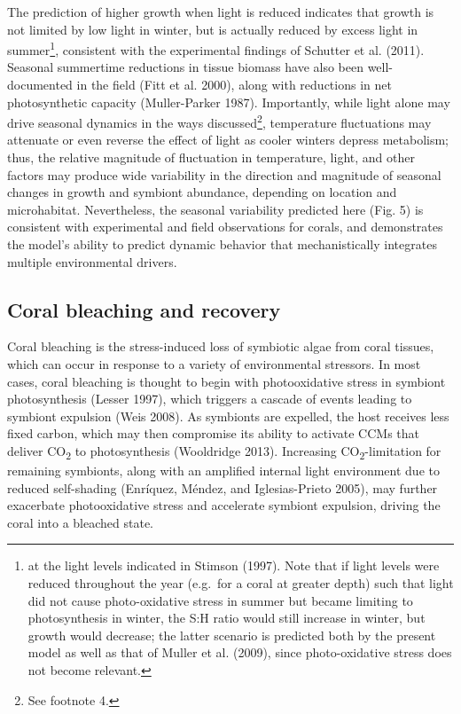 \documentclass[]{elsarticle} %
\begin{document}
The prediction of higher growth when light is reduced indicates that
growth is not limited by low light in winter, but is actually reduced by
excess light in summer\footnote{at the light levels indicated in Stimson
  (1997). Note that if light levels were reduced throughout the year
  (e.g.~for a coral at greater depth) such that light did not cause
  photo-oxidative stress in summer but became limiting to photosynthesis
  in winter, the S:H ratio would still increase in winter, but growth
  would decrease; the latter scenario is predicted both by the present
  model as well as that of Muller et al. (2009), since photo-oxidative
  stress does not become relevant.}, consistent with the experimental
findings of Schutter et al. (2011). Seasonal summertime reductions in
tissue biomass have also been well-documented in the field (Fitt et al.
2000), along with reductions in net photosynthetic capacity
(Muller-Parker 1987). Importantly, while light alone may drive seasonal
dynamics in the ways discussed\footnote{See footnote 4.}, temperature
fluctuations may attenuate or even reverse the effect of light as cooler
winters depress metabolism; thus, the relative magnitude of fluctuation
in temperature, light, and other factors may produce wide variability in
the direction and magnitude of seasonal changes in growth and symbiont
abundance, depending on location and microhabitat. Nevertheless, the
seasonal variability predicted here (Fig. 5) is consistent with
experimental and field observations for corals, and demonstrates the
model's ability to predict dynamic behavior that mechanistically
integrates multiple environmental drivers.

\subsection{Coral bleaching and
recovery}\label{coral-bleaching-and-recovery}

Coral bleaching is the stress-induced loss of symbiotic algae from coral
tissues, which can occur in response to a variety of environmental
stressors. In most cases, coral bleaching is thought to begin with
photooxidative stress in symbiont photosynthesis (Lesser 1997), which
triggers a cascade of events leading to symbiont expulsion (Weis 2008).
As symbionts are expelled, the host receives less fixed carbon, which
may then compromise its ability to activate CCMs that deliver
CO\textsubscript{2} to photosynthesis (Wooldridge 2013). Increasing
CO\textsubscript{2}-limitation for remaining symbionts, along with an
amplified internal light environment due to reduced self-shading
(Enríquez, Méndez, and Iglesias-Prieto 2005), may further exacerbate
photooxidative stress and accelerate symbiont expulsion, driving the
coral into a bleached state.
\end{document}
